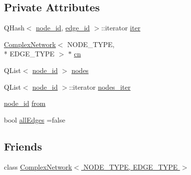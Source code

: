 \subsection*{Private Attributes}
\begin{DoxyCompactItemize}
\item 
Q\+Hash$<$ \hyperlink{_complex_network_8hpp_a8323334ca788fde39682469321590d52}{node\+\_\+id}, \hyperlink{_complex_network_8hpp_ad7d18d7b90a45b6625704e92d10aa3a0}{edge\+\_\+id} $>$\+::iterator \hyperlink{class_complex_network_1_1_edge_iterator_aec1de93d958a15dbb9ee5c142a18f271}{iter}
\item 
\hyperlink{class_complex_network}{Complex\+Network}$<$ N\+O\+D\+E\+\_\+\+T\+Y\+P\+E, \\*
E\+D\+G\+E\+\_\+\+T\+Y\+P\+E $>$ $\ast$ \hyperlink{class_complex_network_1_1_edge_iterator_adac38095121d411d64d387dd97eb1c67}{cn}
\item 
Q\+List$<$ \hyperlink{_complex_network_8hpp_a8323334ca788fde39682469321590d52}{node\+\_\+id} $>$ \hyperlink{class_complex_network_1_1_edge_iterator_a964117946288427210f941e78c93f4b7}{nodes}
\item 
Q\+List$<$ \hyperlink{_complex_network_8hpp_a8323334ca788fde39682469321590d52}{node\+\_\+id} $>$\+::iterator \hyperlink{class_complex_network_1_1_edge_iterator_a4bf6c92361c1c0d0b8eb273e81a163f5}{nodes\+\_\+iter}
\item 
\hyperlink{_complex_network_8hpp_a8323334ca788fde39682469321590d52}{node\+\_\+id} \hyperlink{class_complex_network_1_1_edge_iterator_a380ccd02563bb5192f6b1e81409d6559}{from}
\item 
bool \hyperlink{class_complex_network_1_1_edge_iterator_a068bdce3c6e9cd86518aee5104e2fe64}{all\+Edges} =false
\end{DoxyCompactItemize}
\subsection*{Friends}
\begin{DoxyCompactItemize}
\item 
class \hyperlink{class_complex_network_1_1_edge_iterator_ad8438fc5199b628ea294f77319026b6a}{Complex\+Network$<$ N\+O\+D\+E\+\_\+\+T\+Y\+P\+E, E\+D\+G\+E\+\_\+\+T\+Y\+P\+E $>$}
\end{DoxyCompactItemize}


